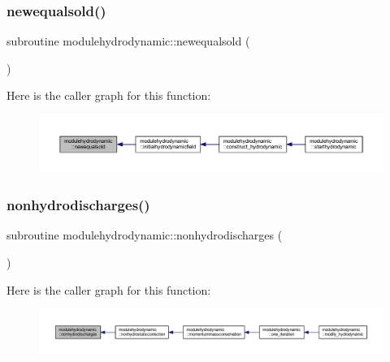 \subsubsection{\texorpdfstring{newequalsold()}{newequalsold()}}
{\footnotesize\ttfamily subroutine modulehydrodynamic\+::newequalsold (\begin{DoxyParamCaption}{ }\end{DoxyParamCaption})\hspace{0.3cm}{\ttfamily [private]}}

Here is the caller graph for this function\+:\nopagebreak
\begin{figure}[H]
\begin{center}
\leavevmode
\includegraphics[width=350pt]{namespacemodulehydrodynamic_a00b05bd1a14d5fd621b3b3ab3463568b_icgraph}
\end{center}
\end{figure}
\mbox{\label{namespacemodulehydrodynamic_a5a21356710281101f911022fe04dd47d}} 
\subsubsection{\texorpdfstring{nonhydrodischarges()}{nonhydrodischarges()}}
{\footnotesize\ttfamily subroutine modulehydrodynamic\+::nonhydrodischarges (\begin{DoxyParamCaption}{ }\end{DoxyParamCaption})\hspace{0.3cm}{\ttfamily [private]}}

Here is the caller graph for this function\+:\nopagebreak
\begin{figure}[H]
\begin{center}
\leavevmode
\includegraphics[width=350pt]{namespacemodulehydrodynamic_a5a21356710281101f911022fe04dd47d_icgraph}
\end{center}
\end{figure}
\mbox{\label{namespacemodulehydrodynamic_aa8e7eaaf3d7106144fb138675637be7e}} 

